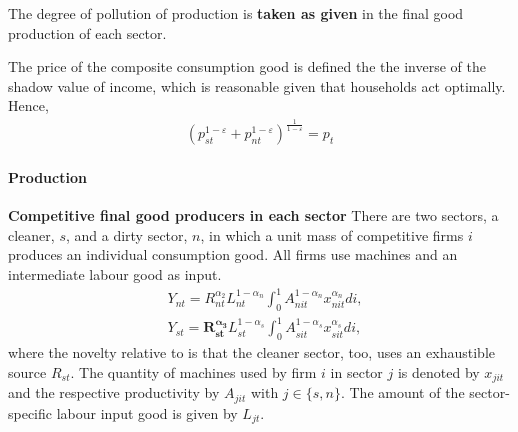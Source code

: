 \documentclass[12pt]{article}
\begin{document}
The degree of pollution of production is \textbf{taken as given} in the final good production of each sector. 

The price of the composite consumption good is defined the the inverse of the shadow value of income, which is reasonable given that households act optimally.
Hence,
\begin{align*}
\left(p_{st}^{1-\varepsilon}+p_{nt}^{1-\varepsilon}\right)^\frac{1}{1-\varepsilon}=p_t
\end{align*}


\paragraph{Production}
\noindent\textbf{Competitive final good producers in each sector}
There are two sectors, a cleaner, $s$, and a dirty sector, $n$, in which a unit mass of competitive firms $i$ produces an individual consumption good. All firms use machines and an intermediate labour good as input. 
\begin{align*}
&Y_{nt}=R_{nt}^{\alpha_2} L_{nt}^{1-\alpha_n}\int_{0}^{1}A_{nit}^{1-\alpha_n}x_{nit}^{\alpha_n} di,\\
&Y_{st}=\pmb{R_{st}^{\alpha_3}} L_{st}^{1-\alpha_s}\int_{0}^{1}A_{sit}^{1-\alpha_s}x_{sit}^{\alpha_s} di, 
\end{align*}
where the novelty relative to \cite{Acemoglu2012TheChange} is that the cleaner sector, too, uses an exhaustible source $R_{st}$. 
The quantity of machines used by firm $i$ in sector $j$ is denoted by $x_{jit}$ and the respective productivity by $A_{jit}$ with $j\in\{s,n\}$. The amount of the sector-specific labour input good is given by $L_{jt}$.
\end{document}
